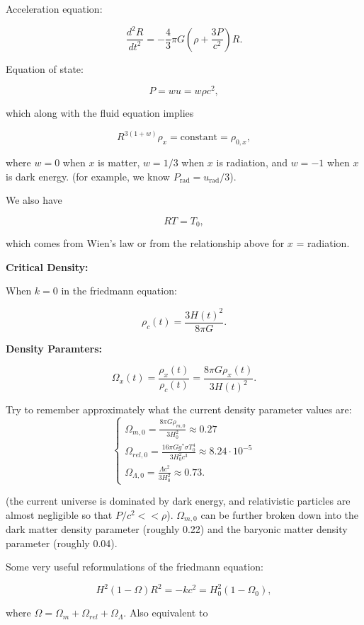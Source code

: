 \documentclass[11pt]{article}
\newcommand{\V}{

\vspace{\baselineskip}

}
\begin{document}
Acceleration equation:

\[\frac{d^{2}R}{dt^{2}} = -\frac{4}{3}\pi G\left(\rho + \frac{3P}{c^{2}}\right)R.\]

Equation of state:

\[P = wu = w\rho c^{2},\]

which along with the fluid equation implies

\[R^{3(1+w)}\rho_{x} = \text{constant} = \rho_{0,x},\]

where $w=0$ when $x$ is matter, $w=1/3$ when $x$ is radiation, and $w=-1$ when $x$ is dark energy. (for example, we know $P_{\text{rad}} = u_{\text{rad}}/3$).

We also have 

\[RT = T_{0},\]

which comes from Wien's law or from the relationship above for $x$ = radiation.\V

\textbf{Critical Density:}

When $k=0$ in the friedmann equation:

\begin{equation*}
\rho_{c}(t) = \frac{3H(t)^{2}}{8\pi G}.
\end{equation*}\V

\textbf{Density Paramters:}

\[\Omega_{x}(t) = \frac{\rho_{x}(t)}{\rho_{c}(t)} = \frac{8\pi G\rho_{x}(t)}{3H(t)^{2}}.\]

Try to remember approximately what the current density parameter values are:
\[\begin{cases}
\displaystyle \Omega_{m,0} =  \frac{8\pi G\rho_{m,0}}{3H_{0}^{2}} \approx 0.27 \\
\displaystyle \Omega_{rel,0} = \frac{16\pi Gg^{*}\sigma T_{0}^{4}}{3H_{0}^{2}c^{3}} \approx 8.24\cdot 10^{-5}\\
\displaystyle \Omega_{\Lambda,0} = \frac{\Lambda c^{2}}{3H_{0}^{2}} \approx 0.73.
\end{cases}
\]

(the current universe is dominated by dark energy, and relativistic particles are almost negligible so that $P/c^{2} << \rho$). $\Omega_{m,0}$ can be further broken down into the dark matter density parameter (roughly 0.22) and the baryonic matter density parameter (roughly 0.04). \V

Some very useful reformulations of the friedmann equation: 

\[H^{2}(1-\Omega)R^{2} = -kc^{2} = H_{0}^{2}(1-\Omega_{0}),\]

where $\Omega = \Omega_{m} + \Omega_{rel} + \Omega_{\Lambda}$. Also equivalent to
\end{document}
